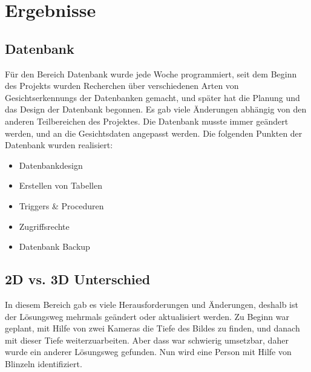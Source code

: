 \newpage
\section{Ergebnisse}
\subsection{Datenbank}
Für den Bereich Datenbank wurde jede Woche programmiert, seit dem Beginn des Projekts wurden Recherchen über verschiedenen Arten von Gesichtserkennungs der Datenbanken gemacht, und später hat die Planung und das Design der Datenbank begonnen. Es gab viele Änderungen abhängig von den anderen Teilbereichen des Projektes. Die Datenbank musste immer geändert werden, und an die Gesichtsdaten angepasst werden. Die folgenden Punkten der Datenbank wurden realisiert:
\begin{itemize}
	\item Datenbankdesign
	\item Erstellen von Tabellen
	\item Triggers \& Proceduren
	\item Zugriffsrechte
	\item Datenbank Backup
\end{itemize}
\subsection{2D vs. 3D Unterschied}
In diesem Bereich gab es viele Herausforderungen und Änderungen, deshalb ist der Lösungsweg mehrmals geändert oder aktualisiert werden. Zu Beginn war geplant, mit Hilfe von zwei Kameras die Tiefe des Bildes zu finden, und danach mit dieser Tiefe weiterzuarbeiten. Aber dass war schwierig umsetzbar, daher wurde ein anderer Lösungsweg gefunden. Nun wird eine Person mit Hilfe von  Blinzeln identifiziert.

